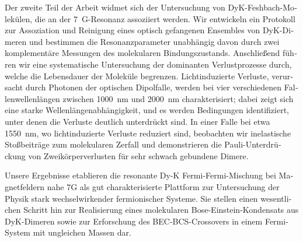 \begin{otherlanguage}{ngerman}
Der zweite Teil der Arbeit widmet sich der Untersuchung von DyK-Feshbach-Molekülen, die an der \SI{7}{G}-Resonanz assoziiert werden. Wir entwickeln ein Protokoll zur Assoziation und Reinigung eines optisch gefangenen Ensembles von DyK-Dimeren und bestimmen die Resonanzparameter unabhängig davon durch zwei komplementäre Messungen des molekularen Bindungszustands. Anschließend führen wir eine systematische Untersuchung der dominanten Verlustprozesse durch, welche die Lebensdauer der Moleküle begrenzen. Lichtinduzierte Verluste, verursacht durch Photonen der optischen Dipolfalle, werden bei vier verschiedenen Fallenwellenlängen zwischen \SI{1000}{nm} und \SI{2000}{nm} charakterisiert; dabei zeigt sich eine starke Wellenlängenabhängigkeit, und es werden Bedingungen identifiziert, unter denen die Verluste deutlich unterdrückt sind. In einer Falle bei etwa \SI{1550}{nm}, wo lichtinduzierte Verluste reduziert sind, beobachten wir inelastische Stoßbeiträge zum molekularen Zerfall und demonstrieren die Pauli-Unterdrückung von Zweikörperverlusten für sehr schwach gebundene Dimere.

Unsere Ergebnisse etablieren die resonante Dy-K Fermi-Fermi-Mischung bei Magnetfeldern nahe 7G als gut charakterisierte Plattform zur Untersuchung der Physik stark wechselwirkender fermionischer Systeme. Sie stellen einen wesentlichen Schritt hin zur Realisierung eines molekularen Bose-Einstein-Kondensats aus DyK-Dimeren sowie zur Erforschung des BEC-BCS-Crossovers in einem Fermi-System mit ungleichen Massen dar.
\end{otherlanguage}


\endgroup

\vfill
